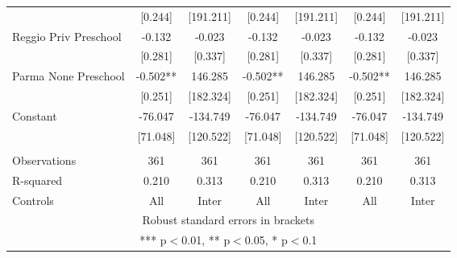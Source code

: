 \begin{tabular}{lcccccc}
 & [0.244] & [191.211] & [0.244] & [191.211] & [0.244] & [191.211] \\
Reggio Priv Preschool & -0.132 & -0.023 & -0.132 & -0.023 & -0.132 & -0.023 \\
 & [0.281] & [0.337] & [0.281] & [0.337] & [0.281] & [0.337] \\
Parma None Preschool & -0.502** & 146.285 & -0.502** & 146.285 & -0.502** & 146.285 \\
 & [0.251] & [182.324] & [0.251] & [182.324] & [0.251] & [182.324] \\
Constant & -76.047 & -134.749 & -76.047 & -134.749 & -76.047 & -134.749 \\
 & [71.048] & [120.522] & [71.048] & [120.522] & [71.048] & [120.522] \\
 &  &  &  &  &  &  \\
Observations & 361 & 361 & 361 & 361 & 361 & 361 \\
R-squared & 0.210 & 0.313 & 0.210 & 0.313 & 0.210 & 0.313 \\
 Controls & All & Inter & All & Inter & All & Inter \\ \hline
\multicolumn{7}{c}{ Robust standard errors in brackets} \\
\multicolumn{7}{c}{ *** p$<$0.01, ** p$<$0.05, * p$<$0.1} \\
\end{tabular}
